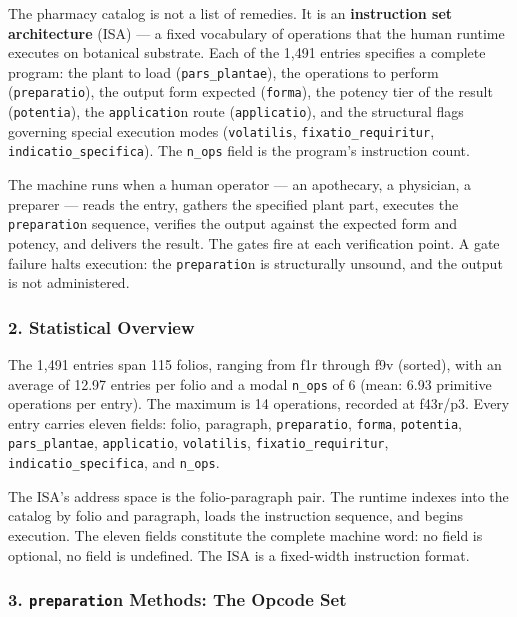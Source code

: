 \documentclass[12pt,a4paper]{article}
\begin{document}
The pharmacy catalog is not a list of remedies. It is an
\textbf{instruction set architecture} (ISA) --- a fixed vocabulary of
operations that the human runtime executes on botanical substrate. Each
of the 1,491 entries specifies a complete program: the plant to load
(\texttt{pars\_plantae}), the operations to perform
(\texttt{preparatio}), the output form expected (\texttt{forma}), the
potency tier of the result (\texttt{potentia}), the \texttt{applicatio}n
route (\texttt{applicatio}), and the structural flags governing special
execution modes (\texttt{volatilis}, \texttt{fixatio\_requiritur},
\texttt{indicatio\_specifica}). The \texttt{n\_ops} field is the
program's instruction count.

The machine runs when a human operator --- an apothecary, a physician, a
preparer --- reads the entry, gathers the specified plant part, executes
the \texttt{preparatio}n sequence, verifies the output against the
expected form and potency, and delivers the result. The gates fire at
each verification point. A gate failure halts execution: the
\texttt{preparatio}n is structurally unsound, and the output is not
administered.

\hypertarget{statistical-overview}{%
\subsubsection{2. Statistical Overview}\label{statistical-overview}}

The 1,491 entries span 115 folios, ranging from f1r through f9v
(sorted), with an average of 12.97 entries per folio and a modal
\texttt{n\_ops} of 6 (mean: 6.93 primitive operations per entry). The
maximum is 14 operations, recorded at f43r/p3. Every entry carries
eleven fields: folio, paragraph, \texttt{preparatio}, \texttt{forma},
\texttt{potentia}, \texttt{pars\_plantae}, \texttt{applicatio},
\texttt{volatilis}, \texttt{fixatio\_requiritur},
\texttt{indicatio\_specifica}, and \texttt{n\_ops}.

The ISA's address space is the folio-paragraph pair. The runtime indexes
into the catalog by folio and paragraph, loads the instruction sequence,
and begins execution. The eleven fields constitute the complete machine
word: no field is optional, no field is undefined. The ISA is a
fixed-width instruction format.

\hypertarget{preparation-methods-the-opcode-set}{%
\subsubsection{\texorpdfstring{3. \texttt{preparatio}n Methods: The
Opcode
Set}{3. preparation Methods: The Opcode Set}}\label{preparation-methods-the-opcode-set}}
\end{document}
